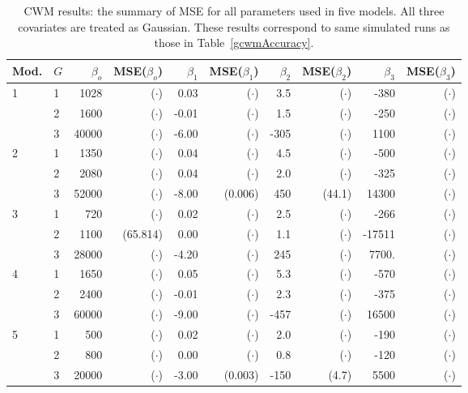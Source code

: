 \documentclass[11pt,letterpaper]{article}
\numberwithin{equation}{section}
\numberwithin{equation}{section}
\numberwithin{equation}{section}
\begin{document}
\begin{table}[!htb]
\centering
\caption{CWM results: the summary of MSE for all parameters used in five models. All three covariates are treated as Gaussian. These results correspond to same simulated runs as those in Table~\ref{gcwmAccuracy}.}
\label{my-label}
\begin{tabular}{ll|rrrrrrrr}
\hline
Mod. & $G$ & $\beta_o$ &  MSE($\beta_o$)   &  $\beta_1$ & MSE($\beta_1$)& $\beta_2$ &MSE($\beta_2$)   & $\beta_3$ &  MSE($\beta_3$)  \\
\hline
1     & 1         & 1028& ($\cdot$)   & 0.03&  ($\cdot$)   & 3.5&  ($\cdot$)    & -380&  ($\cdot$)    \\
      & 2         & 1600&  ($\cdot$)      & -0.01& ($\cdot$)  & 1.5& ($\cdot$)     & -250& ($\cdot$)  \\
      & 3         & 40000& ($\cdot$)     & -6.00& ($\cdot$)  & -305& ($\cdot$)  & 1100& ($\cdot$)    \\
\hline
2     & 1         & 1350& ($\cdot$)     & 0.04& ($\cdot$) & 4.5& ($\cdot$)    & -500& ($\cdot$)  \\
      & 2         & 2080&  ($\cdot$)    & 0.04& ($\cdot$)   & 2.0& ($\cdot$)     & -325& ($\cdot$)   \\
      & 3         & 52000&  ($\cdot$)     & -8.00& (0.006)  & 450& (44.1)   & 14300& ($\cdot$)  \\
\hline
3     & 1         & 720&  ($\cdot$)     & 0.02& ($\cdot$)   & 2.5& ($\cdot$)    & -266& ($\cdot$)    \\
      & 2         & 1100&  (65.814)     & 0.00& ($\cdot$)   & 1.1& ($\cdot$)     & -17511& ($\cdot$)  \\
      & 3         & 28000& ($\cdot$)   & -4.20& ($\cdot$)  & 245& ($\cdot$)   & 7700.& ($\cdot$)  \\
\hline
4     & 1         & 1650& ($\cdot$)    & 0.05& ($\cdot$)  & 5.3& ($\cdot$)    & -570& ($\cdot$)  \\
      & 2         & 2400&  ($\cdot$)     & -0.01& ($\cdot$)  & 2.3& ($\cdot$)    & -375& ($\cdot$)    \\
      & 3         & 60000&  ($\cdot$)     & -9.00& ($\cdot$)  & -457& ($\cdot$)  & 16500& ($\cdot$)   \\
\hline
5     & 1         & 500&  ($\cdot$)     & 0.02& ($\cdot$)   & 2.0& ($\cdot$)   & -190& ($\cdot$)  \\
      & 2         & 800&  ($\cdot$)      & 0.00& ($\cdot$)   & 0.8& ($\cdot$)    & -120& ($\cdot$)  \\
      & 3         & 20000&  ($\cdot$)     & -3.00& (0.003)  & -150& (4.7) & 5500& ($\cdot$) \\
\hline
\end{tabular}
\end{table}
\end{document}
